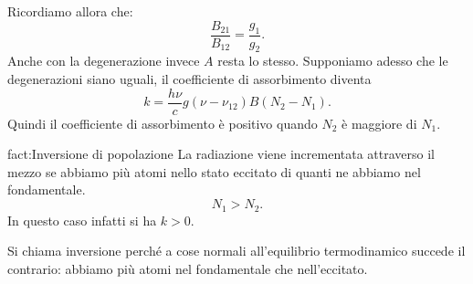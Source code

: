 Ricordiamo allora che:
\[
\frac{B_{21}}{B_{12}} = \frac{g_1}{g_2}
.\] 
Anche con la degenerazione invece $A$ resta lo stesso. Supponiamo adesso che le degenerazioni siano uguali, il coefficiente di assorbimento diventa
\[
    k=\frac{h\nu}{c}g(\nu-\nu_{12})B (N_2-N_1) 
.\] 
Quindi il coefficiente di assorbimento è positivo quando $N_2$ è maggiore di $N_1$. \\
\begin{fact}{fact:Inversione di popolazione}
La radiazione viene incrementata attraverso il mezzo se abbiamo più atomi nello stato eccitato di quanti ne abbiamo nel fondamentale.
\[
    N_1>N_2
.\] 
In questo caso infatti si ha $k>0$.
\end{fact}
Si chiama inversione perché a cose normali all'equilibrio termodinamico succede il contrario: abbiamo più atomi nel fondamentale che nell'eccitato.
